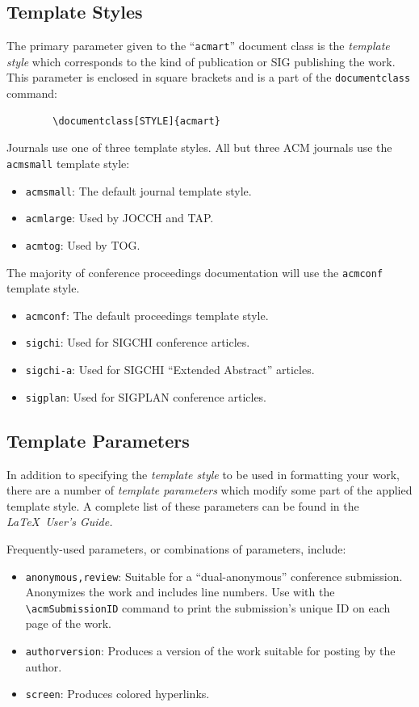\documentclass[sigconf]{acmart}
\begin{document}
	\subsection{Template Styles}
	
	The primary parameter given to the ``\verb|acmart|'' document class is
	the {\itshape template style} which corresponds to the kind of publication
	or SIG publishing the work. This parameter is enclosed in square
	brackets and is a part of the {\verb|documentclass|} command:
	\begin{verbatim}
		\documentclass[STYLE]{acmart}
	\end{verbatim}
	
	Journals use one of three template styles. All but three ACM journals
	use the {\verb|acmsmall|} template style:
	\begin{itemize}
		\item {\verb|acmsmall|}: The default journal template style.
		\item {\verb|acmlarge|}: Used by JOCCH and TAP.
		\item {\verb|acmtog|}: Used by TOG.
	\end{itemize}
	
	The majority of conference proceedings documentation will use the {\verb|acmconf|} template style.
	\begin{itemize}
		\item {\verb|acmconf|}: The default proceedings template style.
		\item{\verb|sigchi|}: Used for SIGCHI conference articles.
		\item{\verb|sigchi-a|}: Used for SIGCHI ``Extended Abstract'' articles.
		\item{\verb|sigplan|}: Used for SIGPLAN conference articles.
	\end{itemize}
	
	\subsection{Template Parameters}
	
	In addition to specifying the {\itshape template style} to be used in
	formatting your work, there are a number of {\itshape template parameters}
	which modify some part of the applied template style. A complete list
	of these parameters can be found in the {\itshape \LaTeX\ User's Guide.}
	
	Frequently-used parameters, or combinations of parameters, include:
	\begin{itemize}
		\item {\verb|anonymous,review|}: Suitable for a ``dual-anonymous''
		conference submission. Anonymizes the work and includes line
		numbers. Use with the \verb|\acmSubmissionID| command to print the
		submission's unique ID on each page of the work.
		\item{\verb|authorversion|}: Produces a version of the work suitable
		for posting by the author.
		\item{\verb|screen|}: Produces colored hyperlinks.
	\end{itemize}
	
\end{document}
